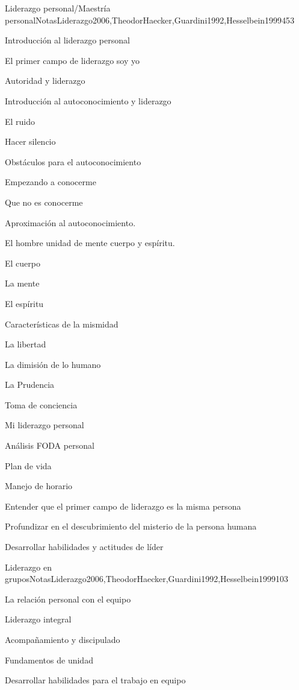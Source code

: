 \begin{syllabus}
\begin{unit}{Liderazgo personal/Maestría personal}{NotasLiderazgo2006,TheodorHaecker,Guardini1992,Hesselbein1999}{45}{3}
\begin{topics}
	\item Introducción al liderazgo personal
	\item El primer campo de liderazgo soy yo
	\item Autoridad y liderazgo
	\item Introducción al autoconocimiento y liderazgo
	\item El ruido
	\item Hacer silencio
	\item Obstáculos para el autoconocimiento
	\item Empezando a conocerme
	\item Que no es conocerme
	\item Aproximación al autoconocimiento.
	\item El hombre unidad de mente cuerpo y espíritu.
	\item El cuerpo
	\item La mente
	\item El espíritu
	\item Características de la mismidad
	\item La libertad
	\item La dimisión de lo humano
	\item La Prudencia
	\item Toma de conciencia
	\item Mi liderazgo personal
	\item Análisis FODA personal
	\item Plan de vida
	\item Manejo de horario
\end{topics}
\begin{learningoutcomes}
	\item Entender que el primer campo de liderazgo es la misma persona
	\item Profundizar en el descubrimiento del misterio de la persona humana
	\item Desarrollar habilidades y actitudes de líder
\end{learningoutcomes}
\end{unit}

\begin{unit}{Liderazgo en grupos}{NotasLiderazgo2006,TheodorHaecker,Guardini1992,Hesselbein1999}{10}{3}
\begin{topics}
	\item La relación personal con el equipo
	\item Liderazgo integral
	\item Acompañamiento y discipulado
	\item Fundamentos de unidad
\end{topics}
\begin{learningoutcomes}
	\item Desarrollar habilidades para el trabajo en equipo
\end{learningoutcomes}
\end{unit}




\end{syllabus}
